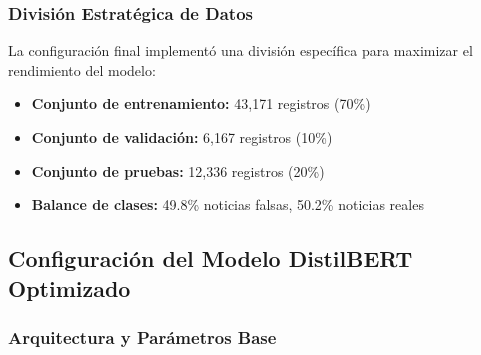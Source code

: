 \subsubsection{División Estratégica de Datos}

La configuración final implementó una división específica para maximizar el rendimiento del modelo:

\begin{itemize}
    \item \textbf{Conjunto de entrenamiento:} 43,171 registros (70\%)
    \item \textbf{Conjunto de validación:} 6,167 registros (10\%)
    \item \textbf{Conjunto de pruebas:} 12,336 registros (20\%)
    \item \textbf{Balance de clases:} 49.8\% noticias falsas, 50.2\% noticias reales
\end{itemize}

\subsection{Configuración del Modelo DistilBERT Optimizado}
\label{subsec:configuracion_distilbert}

\subsubsection{Arquitectura y Parámetros Base}

\begin{table}[htbp]
\centering
{}
\caption{Configuración de la arquitectura del modelo DistilBERT implementado.}
\label{tab:configuracion_distilbert}
\end{table}

